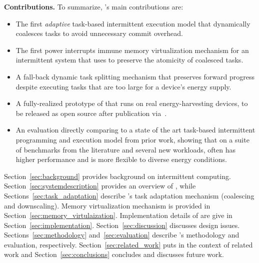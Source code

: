%
%
%
\textbf{Contributions.} To summarize, \sys's main contributions are: 
%
\begin{itemize}
\item The first {\em adaptive} task-based intermittent execution model that dynamically coalesces tasks to avoid unnecessary commit overhead. 
\item The first power interrupts immune memory virtualization mechanism for an intermittent system that \sys uses to preserve the atomicity of coalesced tasks.
\item A fall-back dynamic task splitting mechanism that preserves forward progress despite executing tasks that are too large for a device's energy supply.
\item A fully-realized prototype of \sys that runs on real energy-harvesting devices, to be released as open source after publication via~\cite{coala_website}. 
\item An evaluation directly comparing \sys to a state of the art task-based intermittent programming and execution model from prior work, showing that on a suite of benchmarks from the literature and several new workloads, \sys often has higher performance and is more flexible to diverse energy conditions. 
\end{itemize}
%
Section~\ref{sec:background} provides background on intermittent computing.
Section~\ref{sec:systemdescription} provides an overview of \sys, while
Sections~\ref{sec:task_adaptation} describe \sys's task adaptation mechanism (coalescing and downscaling). Memory virtualization mechanism is provided in Section~\ref{sec:memory_virtulaization}. Implementation details of \sys are give in Section~\ref{sec:implementation}. Section~\ref{sec:discussion} discusses \sys
design issues. Sections~\ref{sec:methodology} and~\ref{sec:evaluation} describe
\sys's methodology and evaluation, respectively. Section~\ref{sec:related_work} puts \sys in the
context of related work and Section~\ref{sec:conclusions} concludes and discusses
future work.